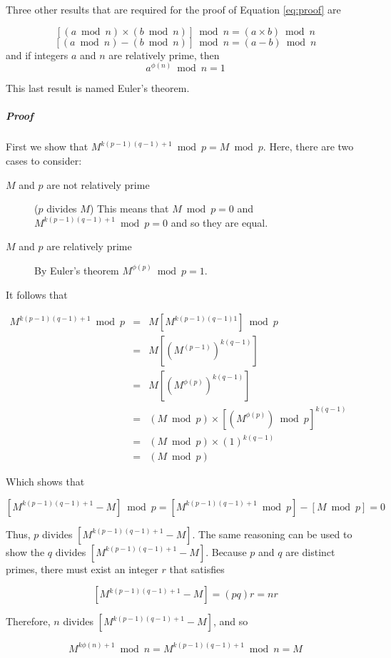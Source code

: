\documentclass[a4paper,12pt]{report}
\begin{document}
Three other results that are required for the proof of Equation \ref{eq:proof} are

\[ [(a\bmod n)\times(b \bmod n)] \bmod n = (a \times b) \bmod n \]
\[ [(a\bmod n) - (b \bmod n)] \bmod n = (a - b) \bmod n \]
and if integers $a$ and $n$ are relatively prime, then
\[a^{\phi(n)} \bmod n = 1 \]

This last result is named Euler's theorem. 

\subparagraph{Proof}

First we show that $M^{k(p-1)(q-1) + 1} \bmod p = M \bmod p$. Here, there are two cases to consider:

\begin{description}
 \item[$M$ and $p$ are not relatively prime] ($p$ divides $M$) This means that $M \bmod p = 0$ and $M^{k(p-1)(q-1) + 1} \bmod p = 0$ and so they are equal. 
 \item[$M$ and $p$ are relatively prime] By Euler's theorem $M^{\phi(p)} \bmod p = 1$.
\end{description}

It follows that

\begin{center}
$\begin{array}{lcl} M^{k(p-1)(q-1) + 1} \bmod p & = & M[M^{k(p-1)(q-1)1}] \bmod p  \\  
						& = & M[(M^{(p-1)})^{k(q-1)}] \\
						& = & M[(M^{\phi(p)})^{k(q-1)}]  \\
						& = & (M \bmod p) \times [(M^{\phi(p)}) \bmod p]^{k(q-1)} \\
						& = & (M \bmod p) \times (1)^{k(q-1)} \\
						& = & (M \bmod p) 
\end{array}$
\end{center}

Which shows that 

\[ [M^{k(p-1)(q-1) + 1} - M]\bmod p = [M^{k(p-1)(q-1) + 1} \bmod p] - [M \bmod p] = 0 \]

Thus, $p$ divides $[M^{k(p-1)(q-1) + 1} - M]$. The same reasoning can be used to show the $q$ divides $[M^{k(p-1)(q-1) + 1} - M]$. Because $p$ and $q$ are distinct primes, there must exist an integer $r$ that satisfies 

\[ [M^{k(p-1)(q-1) + 1} - M] = (pq)r = nr \]

Therefore, $n$ divides $[M^{k(p-1)(q-1) + 1} - M]$, and so

\[ M^{k\phi(n) + 1} \bmod n = M^{k(p-1)(q-1) + 1} \bmod n = M \]
\end{document}
